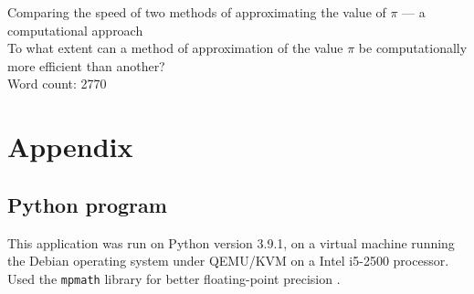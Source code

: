 \documentclass[12pt,a4paper]{article}
\begin{document}
\doublespacing %



\begin{titlepage}
    \begin{center}
    \vspace*{4cm}
        Comparing the speed of two methods of approximating the value of $\pi$ --- a computational approach\\
    \vspace{1cm}
    To what extent can a method of approximation of the value $\pi$ be computationally more efficient than another? \\
    \vspace{4cm}
    Word count: 2770
    \vfill
    \vspace{0.1cm}
    \end{center}
    \end{titlepage}



\begin{center}
\tableofcontents
\vspace{1in}

\end{center}



\newpage
















\printbibliography[heading=bibintoc, title=Works Cited]

\appendix
\section{Appendix}
\label{app}
\subsection{Python program}
\label{app:scripts}
This application was run on Python version 3.9.1, on a virtual machine running the Debian operating system under QEMU/KVM on a Intel i5-2500 processor. Used the \verb|mpmath| library for better floating-point 
precision \cite{mpmath}. 

\end{document}
